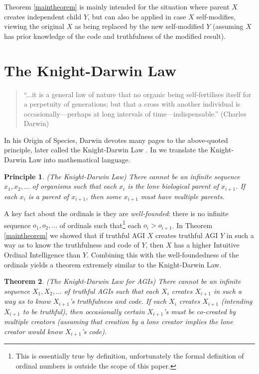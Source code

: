 \documentclass[runningheads]{llncs}
\newtheorem{mytheorem}{Theorem}
\newtheorem{myprinciple}[mytheorem]{Principle}
\begin{document}
Theorem \ref{maintheorem} is mainly intended for the situation where parent $X$ creates
independent child $Y$, but can also be applied in case $X$ self-modifies,
viewing the original $X$ as being replaced by the new self-modified
$Y$ (assuming $X$ has prior
knowledge of the code and truthfulness of the modified result).

\section{The Knight-Darwin Law}
\label{knightdarwinagisection}

\begin{quote}
``...it is a general law of nature that no organic being self-fertilises itself
for a perpetuity of generations; but that a cross with another individual
is occasionally---perhaps at long intervals of time---indispensable.''
(Charles Darwin)
\end{quote}

In his Origin of Species, Darwin devotes many
pages to the above-quoted principle, later called the
Knight-Darwin Law \cite{darwin1898knight}. In \cite{alexander2013}
we translate
the Knight-Darwin Law into mathematical language.

\begin{myprinciple}
(The Knight-Darwin Law)
There cannot be an infinite sequence
$x_1,x_2,\ldots$ of organisms such that each $x_i$
is the lone biological parent of $x_{i+1}$.
If each $x_i$ is a parent of $x_{i+1}$, then some $x_{i+1}$
must have multiple parents.
\end{myprinciple}

A key fact about the ordinals is they
are \emph{well-founded}:
there is
no infinite sequence $o_1,o_2,\ldots$ of ordinals such that\footnote{This
is essentially true by definition,
unfortunately the formal definition of ordinal numbers is outside the scope of
this paper.} each
$o_i>o_{i+1}$. In Theorem \ref{maintheorem} we showed that if truthful
AGI $X$ creates truthful AGI $Y$ in such a way as to know the truthfulness
and code of $Y$, then $X$ has a higher Intuitive Ordinal Intelligence
than $Y$. Combining this with the well-foundedness of the ordinals yields
a theorem extremely similar to the Knight-Darwin Law.

\begin{mytheorem}
\label{maintheorem2}
(The Knight-Darwin Law for AGIs)
There cannot be an infinite sequence
$X_1,X_2,\ldots$ of truthful AGIs such that each $X_i$
creates $X_{i+1}$ in such a way as to know $X_{i+1}$'s truthfulness and code.
If each $X_i$ creates $X_{i+1}$ (intending $X_{i+1}$ to be truthful), then
occasionally certain $X_{i+1}$'s must be
co-created by multiple creators (assuming that creation by
a lone creator implies the lone creator would know $X_{i+1}$'s code).
\end{mytheorem}
\end{document}
